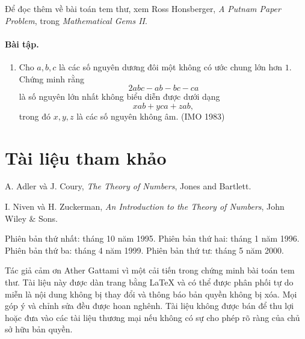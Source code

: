\documentclass[11pt]{article}
\begin{document}
Để đọc thêm về bài toán tem thư, xem Ross Honsberger, \textit{A Putnam Paper
Problem}, trong \textit{Mathematical Gems II}.

\paragraph{Bài tập.}
\begin{enumerate}
\item Cho \(a,b,c\) là các số nguyên dương đôi một không có ước chung lớn hơn
\(1\). Chứng minh rằng
\[
 2abc-ab-bc-ca
\]
là số nguyên lớn nhất không biểu diễn được dưới dạng
\[
 xab+yca+zab,
\]
trong đó \(x,y,z\) là các số nguyên không âm. (IMO 1983)
\end{enumerate}

\section*{Tài liệu tham khảo}

A. Adler và J. Coury, \textit{The Theory of Numbers}, Jones and Bartlett.

I. Niven và H. Zuckerman, \textit{An Introduction to the Theory of Numbers},
John Wiley \& Sons.

Phiên bản thứ nhất: tháng 10 năm 1995. Phiên bản thứ hai: tháng 1 năm 1996.
Phiên bản thứ ba: tháng 4 năm 1999. Phiên bản thứ tư: tháng 5 năm 2000.

Tác giả cảm ơn Ather Gattami vì một cải tiến trong chứng minh bài toán tem
thư. Tài liệu này được dàn trang bằng \LaTeX{} và có thể được phân phối tự do
miễn là nội dung không bị thay đổi và thông báo bản quyền không bị xóa. Mọi
góp ý và chỉnh sửa đều được hoan nghênh. Tài liệu không được bán để thu lợi
hoặc đưa vào các tài liệu thương mại nếu không có sự cho phép rõ ràng của chủ
sở hữu bản quyền.
\end{document}
